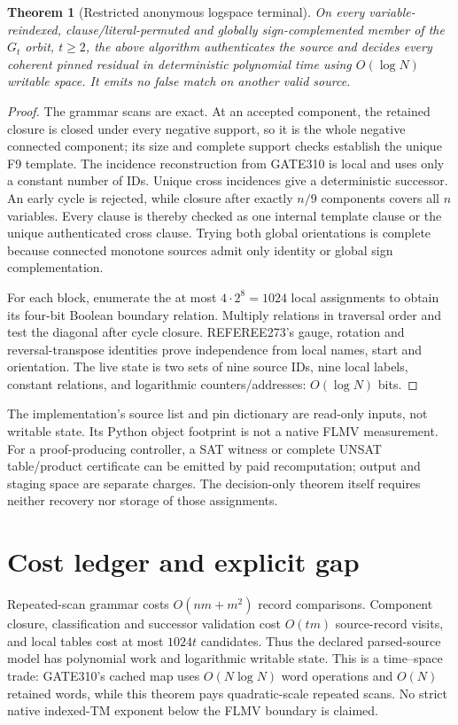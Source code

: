 \documentclass[11pt]{article}
\newtheorem{theorem}{Theorem}
\begin{document}
\begin{theorem}[Restricted anonymous logspace terminal]
On every variable-reindexed, clause/literal-permuted and globally sign-complemented
member of the $G_t$ orbit, $t\ge2$, the above algorithm authenticates the source
and decides every coherent pinned residual in deterministic polynomial time using
$O(\log N)$ writable space.  It emits no false match on another valid source.
\end{theorem}
\begin{proof}
The grammar scans are exact.  At an accepted component, the retained closure is
closed under every negative support, so it is the whole negative connected
component; its size and complete support checks establish the unique F9 template.
The incidence reconstruction from GATE310 is local and uses only a constant number
of IDs.  Unique cross incidences give a deterministic successor.  An early cycle
is rejected, while closure after exactly $n/9$ components covers all $n$ variables.
Every clause is thereby checked as one internal template clause or the unique
authenticated cross clause.  Trying both global orientations is complete because
connected monotone sources admit only identity or global sign complementation.

For each block, enumerate the at most $4\cdot2^8=1024$ local assignments to obtain
its four-bit Boolean boundary relation.  Multiply relations in traversal order and
test the diagonal after cycle closure.  REFEREE273's gauge, rotation and
reversal-transpose identities prove independence from local names, start and
orientation.  The live state is two sets of nine source IDs, nine local labels,
constant relations, and logarithmic counters/addresses: $O(\log N)$ bits.
\end{proof}

The implementation's source list and pin dictionary are read-only inputs, not
writable state.  Its Python object footprint is not a native FLMV measurement.
For a proof-producing controller, a SAT witness or complete UNSAT table/product
certificate can be emitted by paid recomputation; output and staging space are
separate charges.  The decision-only theorem itself requires neither recovery nor
storage of those assignments.

\section{Cost ledger and explicit gap}
Repeated-scan grammar costs $O(nm+m^2)$ record comparisons.  Component closure,
classification and successor validation cost $O(tm)$ source-record visits, and
local tables cost at most $1024t$ candidates.  Thus the declared parsed-source
model has polynomial work and logarithmic writable state.  This is a time--space
trade: GATE310's cached map uses $O(N\log N)$ word operations and $O(N)$ retained
words, while this theorem pays quadratic-scale repeated scans.  No strict native
indexed-TM exponent below the FLMV boundary is claimed.
\end{document}
